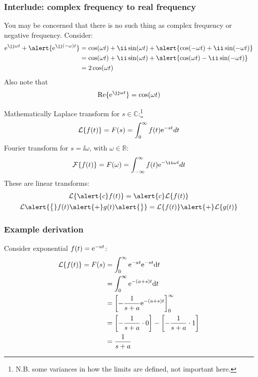 \documentclass{beamer-control}
\begin{document}
\begin{frame}
\frametitle{Interlude: complex frequency to real frequency}
You may be concerned that there is no such thing as complex frequency or negative frequency. Consider:
\begin{align}
\ee^{\jj\ww t} + \alert{\ee^{\jj(-\ww) t}} &= \cos(\ww t)+\ii \sin(\ww t) + \alert{ \cos(-\ww t)+\ii \sin(-\ww t)} \\
&= \cos(\ww t)+\ii \sin(\ww t) + \alert{ \cos(\ww t)-\ii \sin(-\ww t)} \\
&= 2\cos(\ww t)
\end{align}
Also note that
\begin{align}
\Real\{\ee^{\jj\ww t}\} = \cos(\ww t)
\end{align}
\end{frame}



\begin{frame}{Mathematically}
  Laplace transform for $s\in\mathbb{C}$:\footnote{N.B. some variances in how the limits are defined, not important here.}
  \begin{gather}
  \mathcal{L}\{f(t)\} = F(s) = \int_0^\infty f(t) \mathrm{e}^{-st} dt
  \end{gather}
  Fourier transform for $s=\ii\omega$, with $\omega\in\mathbb{R}$:
  \begin{gather}
  \mathcal{F}\{f(t)\} = F(\omega) = \int_{-\infty}^\infty f(t) \Exp{-\ii\omega t} dt
  \end{gather}
  These are linear transforms:
  \begin{gather}
  \mathcal{L}\{\alert{c} f(t)\} = \alert{c}\mathcal{L}\{f(t)\} \\
  \mathcal{L}\alert{\bigl\{}f(t)\alert{+}g(t)\alert{\bigr\}} = \mathcal{L}\{f(t)\}\alert{+}\mathcal{L}\{g(t)\}
  \end{gather}
\end{frame}


\begin{frame}
\frametitle{Example derivation}
Consider exponential $f(t)=\mathrm{e}^{-at}$:
  \begin{align}
  \mathcal{L}\{f(t)\} = F(s) &= \int_0^\infty \mathrm{e}^{-at}\mathrm{e}^{-st} \mathrm{d} t \\
  &= \int_0^\infty \mathrm{e}^{-(a+s)t} \mathrm{d} t \\
  &= \left[-\frac{1}{s+a} \mathrm{e}^{-(a+s)t}\right]_{0}^{\infty} \\
  &= \left[ -\frac{1}{s+a} \cdot 0 \right] - \left[ -\frac{1}{s+a} \cdot 1 \right] \\
  &= \frac{1}{s+a}
  \end{align}
\end{frame}
\end{document}

